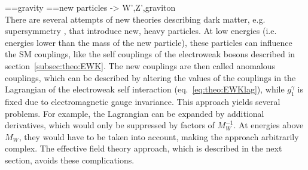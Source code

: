 ==gravity
==new particles -> W',Z',graviton\\
There are several attempts of new theories describing dark matter, e.g. supersymmetry \cite{}, that introduce new, heavy particles. At low energies (i.e. energies lower than the mass of the new particle), these particles can influence the SM couplings, like the self couplings of the electroweak bosons described in section~\ref{subsec:theo:EWK}. The new couplings are then called anomalous couplings, which can be described by altering the values of the couplings in the Lagrangian of the electroweak self interaction (eq.~\ref{eq:theo:EWKlag}), while $g_1^\gamma$ is fixed due to electromagnetic gauge invariance. This approach yields several problems. For example, the Lagrangian can be expanded by additional derivatives, which would only be suppressed by factors of $M_W^{-1}$. At energies above $M_W$, they would have to be taken into account, making the approach arbitrarily complex. The effective field theory approach, which is described in the next section, avoids these complications.



